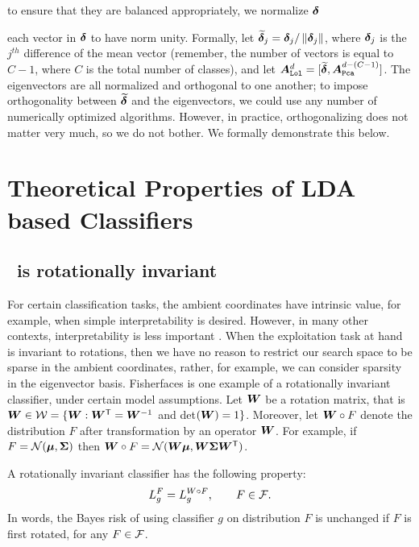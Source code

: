 \documentclass[10pt]{article}
\begin{document}
to ensure that they are balanced appropriately, we normalize $\boldsymbol{\delta}$

each vector in $\boldsymbol{\delta}$ to have norm unity.  Formally, let $\widetilde{\boldsymbol{\delta}}_j = \boldsymbol{\delta}_j / \left \lVert\boldsymbol{\delta}_j \right \rVert$, where $\boldsymbol{\delta}_j$ is the $j^{th}$ difference of the mean vector (remember, the number of vectors is equal to $C-1$, where $C$ is the total number of classes), and let  $\boldsymbol{A}_{{\sc \texttt{Lol}}}^d=[\widetilde{\boldsymbol{\delta}}, \boldsymbol{A}_{{\sc \texttt{Pca}}}^{d-(C-1)}]$.
The eigenvectors are all normalized and orthogonal to one another; to impose orthogonality between $\widetilde{\boldsymbol{\delta}}$ and the eigenvectors, we could use any number of numerically optimized algorithms.  However, in practice, orthogonalizing does not matter very much, so we do not bother. We formally demonstrate this below.




\section[LDA]{Theoretical Properties of LDA based Classifiers}
\label{sec:theory}

\subsection{\Lda~is rotationally invariant}

For certain classification tasks, the ambient coordinates have intrinsic value, for example, when simple interpretability is desired.  However, in many other contexts, interpretability is less important \cite{Breiman2001b}.  When the exploitation task at hand is invariant to rotations, then we have no reason to restrict our search space to be sparse in the ambient coordinates, rather, for example, we can consider sparsity in the eigenvector basis.  Fisherfaces is one example of a rotationally invariant classifier, under certain model assumptions.
Let  $\boldsymbol{W}$ be a rotation matrix, that is $\boldsymbol{W} \in \mathcal{W}=\{\boldsymbol{W} : \boldsymbol{W}^{\mathsf{T}} = \boldsymbol{W}^{-1}$ and det$(\boldsymbol{W})=1\}$.
Moreover, let $\boldsymbol{W} \circ F$ denote the distribution $F$ after transformation by an operator $\boldsymbol{W}$.  For example, if $F=\mathcal{N}(\boldsymbol{\mu},\boldsymbol{\Sigma})$ then $\boldsymbol{W} \circ F=\mathcal{N}(\boldsymbol{W}  \boldsymbol{\mu}, \boldsymbol{W} \boldsymbol{\Sigma} \boldsymbol{W}^{\mathsf{T}})$.

\begin{defi}
A rotationally invariant classifier has the following property:
$$L_g^F = L_g^{W \circ F}, \qquad F \in \mathcal{F}.$$
In words, the Bayes risk of using classifier $g$ on distribution $F$ is unchanged if $F$ is first rotated, for any $F \in \mathcal{F}$.
\end{defi}
\end{document}
